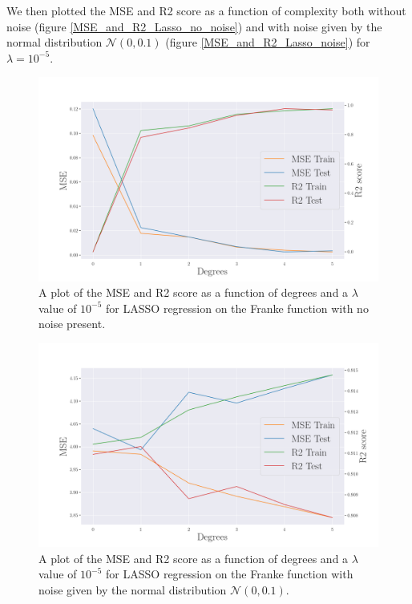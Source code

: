 %
\noindent We then plotted the MSE and R2 score as a function of complexity both without noise (figure \eqref{MSE_and_R2_Lasso_no_noise}) and with noise given by the normal distribution $\mathcal{N}(0,0.1)$ (figure \eqref{MSE_and_R2_Lasso_noise}) for $\lambda = 10^{-5}$.
%
\begin{figure}[H]
    \centering
    \includegraphics[width=\linewidth]
    {images/MSE_and_R2_Lasso.png}
    \caption{A plot of the MSE and R2 score as a function of degrees and a $\lambda$ value of $10^{-5}$ for LASSO regression on the Franke function with no noise present.} \label{MSE_and_R2_Lasso_no_noise}
\end{figure}
%
\begin{figure}[H]
    \centering
    \includegraphics[width=\linewidth]{images/MSE_and_R2_Lasso_noise.png}
    \caption{A plot of the MSE and R2 score as a function of degrees and a $\lambda$ value of $10^{-5}$ for LASSO regression on the Franke function with noise given by the normal distribution $\mathcal{N}(0,0.1)$.} \label{MSE_and_R2_Lasso_noise}
\end{figure}

